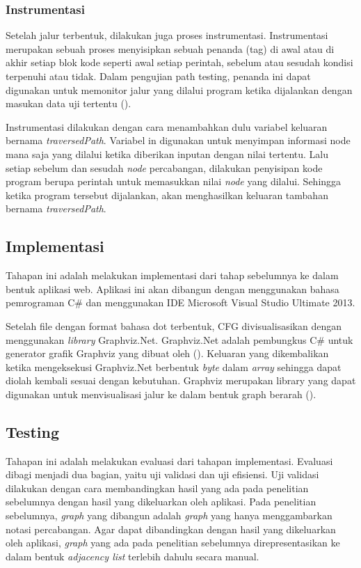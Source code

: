 \subsubsection*{Instrumentasi}
Setelah jalur terbentuk, dilakukan juga proses instrumentasi. Instrumentasi merupakan sebuah proses menyisipkan sebuah penanda (tag) di awal atau di akhir setiap blok kode seperti awal setiap perintah, sebelum atau sesudah kondisi terpenuhi atau tidak. Dalam pengujian path testing, penanda ini dapat digunakan untuk memonitor jalur yang dilalui program ketika dijalankan dengan masukan data uji tertentu (\cite{IRH2014}). 

Instrumentasi dilakukan dengan cara menambahkan dulu variabel keluaran bernama \textit{traversedPath}. Variabel in digunakan untuk menyimpan informasi node mana saja yang dilalui ketika diberikan inputan dengan nilai tertentu. Lalu setiap sebelum dan sesudah \textit{node} percabangan, dilakukan penyisipan kode program berupa perintah untuk memasukkan nilai \textit{node} yang dilalui. Sehingga ketika program tersebut dijalankan, akan menghasilkan keluaran tambahan bernama \textit{traversedPath}. 

\subsection*{Implementasi}

Tahapan ini adalah melakukan implementasi dari tahap sebelumnya ke dalam bentuk aplikasi web. Aplikasi ini akan dibangun dengan menggunakan bahasa pemrograman C\# dan menggunakan IDE Microsoft Visual Studio Ultimate 2013. 

Setelah file dengan format bahasa dot terbentuk, CFG divisualisasikan dengan menggunakan \textit{library} Graphviz.Net. Graphviz.Net adalah pembungkus C\# untuk generator grafik Graphviz yang dibuat oleh \citeauthor{DIXONGRAPHVIZ2013} (\cite*{DIXONGRAPHVIZ2013}). Keluaran yang dikembalikan ketika mengeksekusi Graphviz.Net berbentuk \textit{byte} dalam \textit{array} sehingga dapat diolah kembali sesuai dengan kebutuhan. Graphviz merupakan library yang dapat digunakan untuk menvisualisasi jalur ke dalam bentuk graph berarah (\cite{GANSNER2015}). 


\subsection*{Testing}

Tahapan ini adalah melakukan evaluasi dari tahapan implementasi. Evaluasi dibagi menjadi dua bagian, yaitu uji validasi dan uji efisiensi. Uji validasi dilakukan dengan cara membandingkan hasil yang ada pada penelitian sebelumnya dengan hasil yang dikeluarkan oleh aplikasi. Pada penelitian sebelumnya, \textit{graph} yang dibangun adalah \textit{graph} yang hanya menggambarkan notasi percabangan. Agar dapat dibandingkan dengan hasil yang dikeluarkan oleh aplikasi, \textit{graph} yang ada pada penelitian sebelumnya direpresentasikan ke dalam bentuk \textit{adjacency list} terlebih dahulu secara manual.


